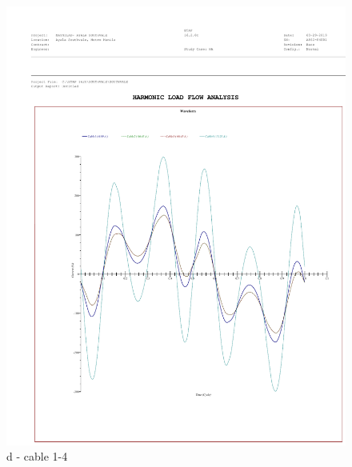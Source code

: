 \begin{figure}
\begin{minipage}[b]{0.4\linewidth}
	\includegraphics[width=\textwidth]{figures/fig_ch04_elecaudit_cable_harmonic_waveform14}
	\caption*{d - cable 1-4}
\end{minipage}
	\hspace{0.05cm}
\begin{minipage}[b]{0.4\linewidth}
	\centering

\end{minipage}
\end{figure}
